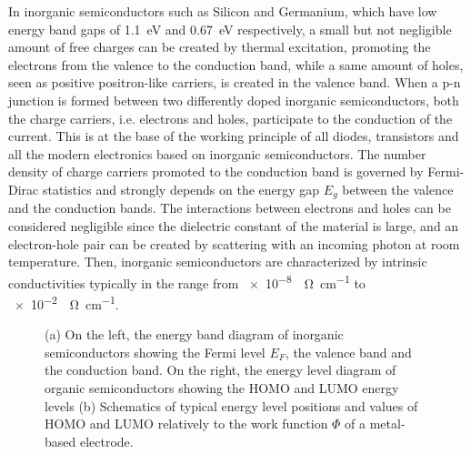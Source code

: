 \documentclass  [
  paper    = a4,
  BCOR     = 10mm,
  twoside,
  fontsize = 12pt,
  fleqn,
  toc      = bibnumbered,
  toc      = listofnumbered,
  numbers  = noendperiod,
  headings = normal,
  listof   = leveldown,
  version  = 3.03
]                                       {scrreprt}
\begin{document}
In inorganic semiconductors such as Silicon and Germanium, which have low energy band gaps of \SI{1.1}{\electronvolt} and \SI{0.67}{\electronvolt} respectively, a small but not negligible amount of free charges can be created by thermal excitation, promoting the electrons from the valence to the conduction band, while a same amount of holes, seen as positive positron-like carriers, is created in the valence band. When a p-n junction is formed between two differently doped inorganic semiconductors, both the charge carriers, i.e. electrons and holes, participate to the conduction of the current. This is at the base of the working principle of all diodes, transistors and all the modern electronics based on inorganic semiconductors. The number density of charge carriers promoted to the conduction band is governed by Fermi-Dirac statistics and strongly depends on the energy gap $E_g$ between the valence and the conduction bands. The interactions between electrons and holes can be considered negligible since the dielectric constant of the material is large, and an electron-hole pair can be created by scattering with an incoming photon at room temperature. Then, inorganic semiconductors are characterized by intrinsic conductivities typically in the range from \SI{e-8}{\per\ohm\per\centi\metre} to \SI{e-2}{\per\ohm\per\centi\metre}.\\
\begin{figure}[t]
	\centering%
	\qquad
	\qquad
	\caption{\footnotesize (a) On the left, the energy band diagram of inorganic semiconductors showing the Fermi level $E_F$, the valence band and the conduction band. On the right, the energy level diagram of organic semiconductors showing the HOMO and LUMO energy levels\cite{book:oled} (b) Schematics of typical energy level positions and values of HOMO and LUMO relatively to the work function $\Phi$ of a metal-based electrode.}%
	\label{fig:energygap}
\end{figure}
\end{document}
